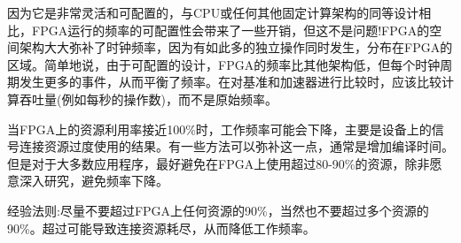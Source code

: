 因为它是非常灵活和可配置的，与CPU或任何其他固定计算架构的同等设计相比，FPGA运行的频率的可配置性会带来了一些开销，但这不是问题!FPGA的空间架构大大弥补了时钟频率，因为有如此多的独立操作同时发生，分布在FPGA的区域。简单地说，由于可配置的设计，FPGA的频率比其他架构低，但每个时钟周期发生更多的事件，从而平衡了频率。在对基准和加速器进行比较时，应该比较计算吞吐量(例如每秒的操作数)，而不是原始频率。\par

当FPGA上的资源利用率接近100\%时，工作频率可能会下降，主要是设备上的信号连接资源过度使用的结果。有一些方法可以弥补这一点，通常是增加编译时间。但是对于大多数应用程序，最好避免在FPGA上使用超过80-90\%的资源，除非愿意深入研究，避免频率下降。\par

\begin{tcolorbox}[colback=red!5!white,colframe=red!75!black]
经验法则:尽量不要超过FPGA上任何资源的90\%，当然也不要超过多个资源的90\%。超过可能导致连接资源耗尽，从而降低工作频率。
\end{tcolorbox}










